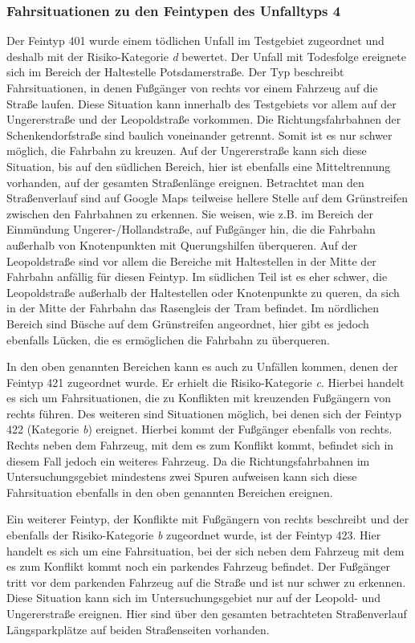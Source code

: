\subsubsection{Fahrsituationen zu den Feintypen des Unfalltyps 4}
Der Feintyp 401 wurde einem tödlichen Unfall im Testgebiet zugeordnet und deshalb mit der Risiko-Kategorie \textit{d} bewertet. Der Unfall mit Todesfolge ereignete sich im Bereich der Haltestelle Potsdamerstraße. Der Typ beschreibt Fahrsituationen, in denen Fußgänger von rechts vor einem Fahrzeug auf die Straße laufen. Diese Situation kann innerhalb des Testgebiets vor allem auf der Ungererstraße und der Leopoldstraße vorkommen. Die Richtungsfahrbahnen der Schenkendorfstraße sind baulich voneinander getrennt. Somit ist es nur schwer möglich, die Fahrbahn zu kreuzen. Auf der Ungererstraße kann sich diese Situation, bis auf den südlichen Bereich, hier ist ebenfalls eine Mitteltrennung vorhanden, auf der gesamten Straßenlänge ereignen. Betrachtet man den Straßenverlauf sind auf Google Maps teilweise hellere Stelle auf dem Grünstreifen zwischen den Fahrbahnen zu erkennen. Sie weisen, wie z.B. im Bereich der Einmündung Ungerer-/Hollandstraße, auf Fußgänger hin, die die Fahrbahn außerhalb von Knotenpunkten mit Querungshilfen überqueren. Auf der Leopoldstraße sind vor allem die Bereiche mit Haltestellen in der Mitte der Fahrbahn anfällig für diesen Feintyp. Im südlichen Teil ist es eher schwer, die Leopoldstraße außerhalb der Haltestellen oder Knotenpunkte zu queren, da sich in der Mitte der Fahrbahn das Rasengleis der Tram befindet. Im nördlichen Bereich sind Büsche auf dem Grünstreifen angeordnet, hier gibt es jedoch ebenfalls Lücken, die es ermöglichen die Fahrbahn zu überqueren.

In den oben genannten Bereichen kann es auch zu Unfällen kommen, denen der Feintyp 421 zugeordnet wurde. Er erhielt die Risiko-Kategorie \textit{c}. Hierbei handelt es sich um Fahrsituationen, die zu Konflikten mit kreuzenden Fußgängern von rechts führen. Des weiteren sind Situationen möglich, bei denen sich der Feintyp 422 (Kategorie \textit{b}) ereignet. Hierbei kommt der Fußgänger ebenfalls von rechts. Rechts neben dem Fahrzeug, mit dem es zum Konflikt kommt, befindet sich in diesem Fall jedoch ein weiteres Fahrzeug. Da die Richtungsfahrbahnen im Untersuchungsgebiet mindestens zwei Spuren aufweisen kann sich diese Fahrsituation ebenfalls in den oben genannten Bereichen ereignen.

Ein weiterer Feintyp, der Konflikte mit Fußgängern von rechts beschreibt und der ebenfalls der Risiko-Kategorie \textit{b} zugeordnet wurde, ist der Feintyp 423. Hier handelt es sich um eine Fahrsituation, bei der sich neben dem Fahrzeug mit dem es zum Konflikt kommt noch ein parkendes Fahrzeug befindet. Der Fußgänger tritt vor dem parkenden Fahrzeug auf die Straße und ist nur schwer zu erkennen. Diese Situation kann sich im Untersuchungsgebiet nur auf der Leopold- und Ungererstraße ereignen. Hier sind über den gesamten betrachteten Straßenverlauf Längsparkplätze auf beiden Straßenseiten vorhanden.

